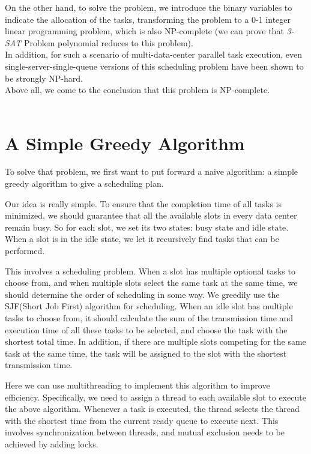 \documentclass{llncs}
\begin{document}
\indent\setlength{\parindent}{2em}On the other hand, to solve the problem, we introduce the binary variables to indicate the allocation of the tasks, transforming the problem to a 0-1 integer linear programming problem, which is also NP-complete (we can prove that \textit{3-SAT} Problem polynomial reduces to this problem).\\
\indent\setlength{\parindent}{2em}In addition, for such a scenario of multi-data-center parallel task execution, even single-server-single-queue versions of this scheduling problem have been shown to be strongly NP-hard\cite{ref_article4}. \\
\indent\setlength{\parindent}{2em}Above all, we come to the conclusion that this problem is NP-complete.\\
\\

\section{A Simple Greedy Algorithm}


To solve that problem, we first want to put forward a naive algorithm: a simple greedy algorithm to give a scheduling plan. 

Our idea is really simple. To ensure that the completion time of all tasks is minimized, we should guarantee that all the available slots in every data center remain busy. So for each slot, we set its two states: busy state and idle state. When a slot is in the idle state, we let it recursively find tasks that can be performed. 

This involves a scheduling problem. When a slot has multiple optional tasks to choose from, and when multiple slots select the same task at the same time, we should determine the order of scheduling in some way. We greedily use the SJF(Short Job First) algorithm for scheduling. When an idle slot has multiple tasks to choose from, it should calculate the sum of the transmission time and execution time of all these tasks to be selected, and choose the task with the shortest total time. In addition, if there are multiple slots competing for the same task at the same time, the task will be assigned to the slot with the shortest transmission time.

Here we can use multithreading to implement this algorithm to improve efficiency. Specifically, we need to assign a thread to each available slot to execute the above algorithm. Whenever a task is executed, the thread selects the thread with the shortest time from the current ready queue to execute next. This involves synchronization between threads, and mutual exclusion needs to be achieved by adding locks.
\end{document}
